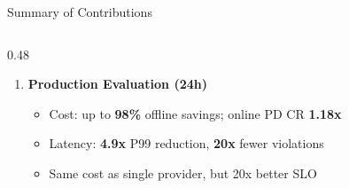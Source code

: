 \documentclass[aspectratio=169,10pt]{beamer}
\begin{document}
\begin{frame}{Summary of Contributions}
\begin{columns}[T]
\begin{column}{0.48\textwidth}
\begin{enumerate}
    \vspace{0.2cm}
    \item \textbf{Production Evaluation (24h)}
    \begin{itemize}
        \item Cost: up to \textbf{98\%} offline savings; online PD CR \textbf{1.18x}
        \item Latency: \textbf{4.9x} P99 reduction, \textbf{20x} fewer violations
        \item Same cost as single provider, but 20x better SLO
    \end{itemize}
\end{enumerate}

\vspace{0.3cm}
\centering
{}
\end{column}
\end{columns}
\end{frame}
\end{document}
